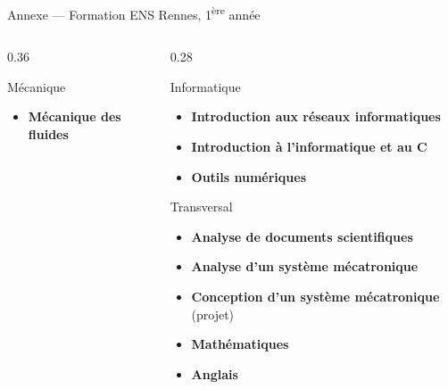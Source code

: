 \documentclass[aspectratio=169]{beamer}
\begin{document}
\begin{frame}[t,shrink=8]{Annexe — Formation ENS Rennes, 1\textsuperscript{ère} année}
\begin{columns}[T]
\begin{column}{0.36\textwidth}
\begin{block}{Mécanique}
\begin{itemize}
						\item \textbf{Mécanique des fluides}
					\end{itemize}
				\end{block}
			\end{column}
			\begin{column}{0.28\textwidth}
				\begin{block}{Informatique}
					\tiny\begin{itemize}\setlength\itemsep{1pt}\setlength\parsep{0pt}
						\item \textbf{Introduction aux réseaux informatiques}
						\item \textbf{Introduction à l'informatique et au C}
						\item \textbf{Outils numériques}
					\end{itemize}
				\end{block}
				\vspace{0.2em}
				\begin{block}{Transversal}
					\tiny\begin{itemize}\setlength\itemsep{1pt}\setlength\parsep{0pt}
						\item \textbf{Analyse de documents scientifiques}
						\item \textbf{Analyse d'un système mécatronique}
						\item \textbf{Conception d'un système mécatronique} (projet)
						\item \textbf{Mathématiques}
						\item \textbf{Anglais}
					\end{itemize}
				\end{block}
			\end{column}
		\end{columns}
	\end{frame}
	
\end{document}
